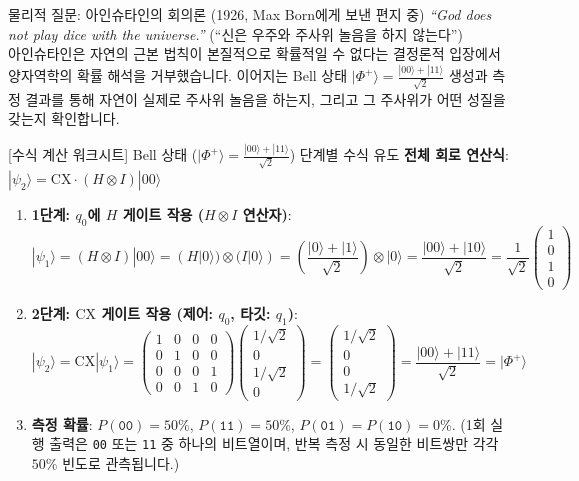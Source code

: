 \documentclass[11pt, a4paper]{article}
\newcommand{\ket}[1]{|#1\rangle}
\theoremstyle{definition}
\begin{document}
\begin{notebox}{물리적 질문: 아인슈타인의 회의론 (1926, Max Born에게 보낸 편지 중)}
\textit{``God does not play dice with the universe.''} (``신은 우주와 주사위 놀음을 하지 않는다'')\\
아인슈타인은 자연의 근본 법칙이 본질적으로 확률적일 수 없다는 결정론적 입장에서 양자역학의 확률 해석을 거부했습니다. 이어지는 Bell 상태 $\ket{\Phi^+} = \frac{\ket{00}+\ket{11}}{\sqrt{2}}$ 생성과 측정 결과를 통해 자연이 실제로 주사위 놀음을 하는지, 그리고 그 주사위가 어떤 성질을 갖는지 확인합니다.
\end{notebox}

\begin{worksheetbox}{[수식 계산 워크시트] Bell 상태 ($\ket{\Phi^+} = \frac{\ket{00}+\ket{11}}{\sqrt{2}}$) 단계별 수식 유도}
\textbf{전체 회로 연산식}: $\ket{\psi_2} = \mathrm{CX} \cdot (H \otimes I)\ket{00}$
\begin{enumerate}
    \item \textbf{1단계: $q_0$에 $H$ 게이트 작용 ($H \otimes I$ 연산자)}:
    $$\ket{\psi_1} = (H \otimes I)\ket{00} = (H\ket{0}) \otimes (I\ket{0}) = \left(\frac{\ket{0}+\ket{1}}{\sqrt{2}}\right) \otimes \ket{0} = \frac{\ket{00} + \ket{10}}{\sqrt{2}} = \frac{1}{\sqrt{2}}\begin{pmatrix} 1 \\ 0 \\ 1 \\ 0 \end{pmatrix}$$
    \item \textbf{2단계: $\mathrm{CX}$ 게이트 작용 (제어: $q_0$, 타깃: $q_1$)}:
    $$\ket{\psi_2} = \mathrm{CX}\ket{\psi_1} = \begin{pmatrix} 1 & 0 & 0 & 0 \\ 0 & 1 & 0 & 0 \\ 0 & 0 & 0 & 1 \\ 0 & 0 & 1 & 0 \end{pmatrix} \begin{pmatrix} 1/\sqrt{2} \\ 0 \\ 1/\sqrt{2} \\ 0 \end{pmatrix} = \begin{pmatrix} 1/\sqrt{2} \\ 0 \\ 0 \\ 1/\sqrt{2} \end{pmatrix} = \frac{\ket{00} + \ket{11}}{\sqrt{2}} = \ket{\Phi^+}$$
    \item \textbf{측정 확률}: $P(\texttt{00}) = 50\%$, $P(\texttt{11}) = 50\%$, $P(\texttt{01}) = P(\texttt{10}) = 0\%$. (1회 실행 출력은 \texttt{00} 또는 \texttt{11} 중 하나의 비트열이며, 반복 측정 시 동일한 비트쌍만 각각 $50\%$ 빈도로 관측됩니다.)
\end{enumerate}
\end{worksheetbox}
\end{document}

